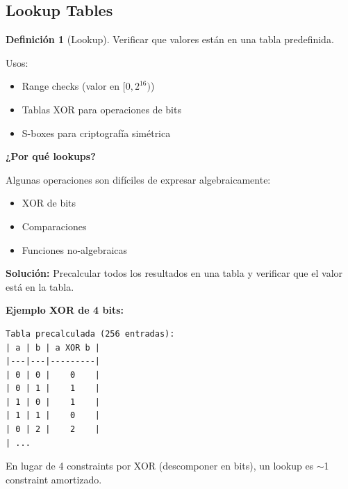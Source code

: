 \documentclass[11pt,a4paper,twoside,openright]{book}
\theoremstyle{definition}
\newtheorem{definition}{Definición}[chapter]
\theoremstyle{plain}
\theoremstyle{remark}
\begin{document}
\subsection{Lookup Tables}

\begin{definition}[Lookup]
Verificar que valores están en una tabla predefinida.
\end{definition}

Usos:
\begin{itemize}
    \item Range checks (valor en $[0, 2^{16})$)
    \item Tablas XOR para operaciones de bits
    \item S-boxes para criptografía simétrica
\end{itemize}

\begin{intuicion}
\textbf{¿Por qué lookups?}

Algunas operaciones son difíciles de expresar algebraicamente:
\begin{itemize}
    \item XOR de bits
    \item Comparaciones
    \item Funciones no-algebraicas
\end{itemize}

\textbf{Solución:} Precalcular todos los resultados en una tabla y verificar que el valor está en la tabla.

\textbf{Ejemplo XOR de 4 bits:}
\begin{verbatim}
Tabla precalculada (256 entradas):
| a | b | a XOR b |
|---|---|---------|
| 0 | 0 |    0    |
| 0 | 1 |    1    |
| 1 | 0 |    1    |
| 1 | 1 |    0    |
| 0 | 2 |    2    |
| ...
\end{verbatim}

En lugar de 4 constraints por XOR (descomponer en bits), un lookup es $\sim$1 constraint amortizado.
\end{intuicion}
\end{document}
